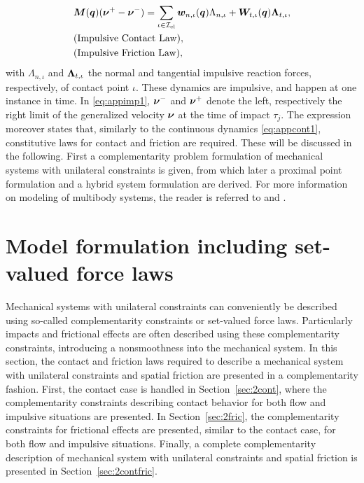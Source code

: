 \documentclass[../DC2017114Bouma.tex]{subfiles}
\begin{document}
\begin{align}
&{\boldsymbol{M}}({\boldsymbol{q}})(\boldsymbol{\nu}^+ - \boldsymbol{\nu}^-) = \sum_{\iota\in\mathcal{I}_{\text{cl}}} {\boldsymbol{w}}_{n,\iota}({\boldsymbol{q}})\Lambda_{n,\iota} + {\boldsymbol{W}}_{t,\iota}({\boldsymbol{q}})\boldsymbol{\Lambda}_{t,\iota}, \label{eq:appimp1}\\
&\text{(Impulsive Contact Law)},\nonumber\\
&\text{(Impulsive Friction Law)},\nonumber
\end{align}
with $\Lambda_{n,\iota}$ and $\boldsymbol{\Lambda}_{t,\iota}$ the normal and tangential impulsive reaction forces, respectively, of contact point $\iota$. These dynamics are impulsive, and happen at one instance in time. In \eqref{eq:appimp1}, $\boldsymbol{\nu}^-$ and $\boldsymbol{\nu}^+$ denote the left, respectively the right limit of the generalized velocity $\boldsymbol{\nu}$ at the time of impact $\tau_j$. The expression moreover states that, similarly to the continuous dynamics \eqref{eq:appcont1}, constitutive laws for contact and friction are required. These will be discussed in the following. First a complementarity problem formulation of mechanical systems with unilateral constraints is given, from which later a proximal point formulation and a hybrid system formulation are derived. For more information on modeling of multibody systems, the reader is referred to \cite{Leine2008} and \cite{Wouw2016}.

\section{Model formulation including set-valued force laws}\label{sec:comp}
Mechanical systems with unilateral constraints can conveniently be described using so-called complementarity constraints or set-valued force laws. Particularly impacts and frictional effects are often described using these complementarity constraints, introducing a nonsmoothness into the mechanical system. In this section, the contact and friction laws required to describe a mechanical system with unilateral constraints and spatial friction are presented in a complementarity fashion. First, the contact case is handled in Section~\ref{sec:2cont}, where the complementarity constraints describing contact behavior for both flow and impulsive situations are presented. In Section~\ref{sec:2fric}, the complementarity constraints for frictional effects are presented, similar to the contact case, for both flow and impulsive situations. Finally, a complete complementarity description of mechanical system with unilateral constraints and spatial friction is presented in Section~\ref{sec:2contfric}.
\end{document}
